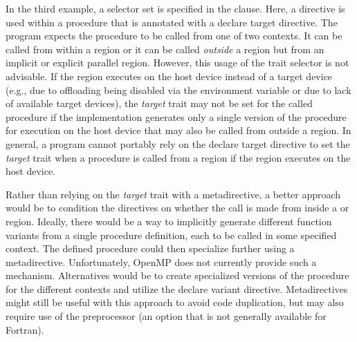 




In the third example, a  selector set is specified in the
 clause. Here, a  directive is used within a
procedure  that is annotated with a declare target
directive. The program expects the procedure to be called from one of two
contexts. It can be called from within a  region or it can
be called \emph{outside} a  region but from an implicit or
explicit parallel region. However, this usage of the  trait
selector is not advisable. If the  region executes on the
host device instead of a target device (e.g., due to offloading being disabled
via the  environment variable or due to lack of
available target devices), the \emph{target} trait may not be set for the
called procedure if the implementation generates only a single version of the
procedure for execution on the host device that may also be called from outside
a  region. In general, a program cannot portably rely on the
declare target directive to set the \emph{target} trait when a procedure is
called from a  region if the region executes on the host device.


\clearpage

Rather than relying on the \emph{target} trait with a metadirective, a better
approach would be to condition the directives on whether the call is made from
inside a  or  region. Ideally, there would be a
way to implicitly generate different function variants from a single procedure
definition, each to be called in some specified context. The defined procedure
could then specialize further using a metadirective. Unfortunately, OpenMP
does not currently provide such a mechanism. Alternatives would be to create
specialized versions of the procedure for the different contexts and utilize
the declare variant directive. Metadirectives might still be useful with this
approach to avoid code duplication, but may also require use of the
preprocessor (an option that is not generally available for Fortran).

